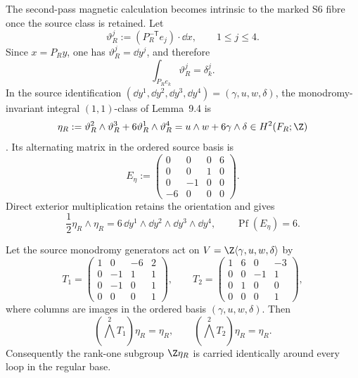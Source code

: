 The second-pass magnetic calculation becomes intrinsic to the marked S6
fibre once the source class is retained.  Let
\begin{equation}\label{eq:s6cusp-integral-coframe}
 \vartheta_R^j:=(P_R^{-\mathsf T}e_j)\mathbin{\cdot}\dd x,
 \qquad 1\le j\le4.
\end{equation}
Since \(x=P_Ry\), one has \(\vartheta_R^j=\dd y^j\), and therefore
\begin{equation}\label{eq:s6cusp-integral-periods}
 \int_{P_Re_k}\vartheta_R^j=\delta_k^j.
\end{equation}
In the source identification
\((\dd y^1,\dd y^2,\dd y^3,\dd y^4)=(\gamma,u,w,\delta)\),
the monodromy-invariant integral \((1,1)\)-class of Lemma~9.4 is
\begin{equation}\label{eq:s6cusp-native-eta}
 \eta_R:=
 \vartheta_R^2\wedge\vartheta_R^3
 +6\vartheta_R^1\wedge\vartheta_R^4
 =u\wedge w+6\gamma\wedge\delta
 \in H^2(F_R;\Z)
 \end{equation}
\cite{S6Internal}.  Its alternating matrix in the ordered source basis is
\begin{equation}\label{eq:s6cusp-native-eta-matrix}
 E_\eta:=
 \begin{pmatrix}
 0&0&0&6\\
 0&0&1&0\\
 0&-1&0&0\\
 -6&0&0&0
 \end{pmatrix}.
\end{equation}
Direct exterior multiplication retains the orientation and gives
\begin{equation}\label{eq:s6cusp-native-eta-square-pfaffian}
 \frac12\eta_R\wedge\eta_R
 =6\,\dd y^1\wedge\dd y^2\wedge\dd y^3\wedge\dd y^4,
 \qquad
 \operatorname{Pf}(E_\eta)=6.
\end{equation}

\begin{proposition}
\label{prop:s6cusp-native-eta-monodromy}
Let the source monodromy generators act on
\(V=\Z\langle\gamma,u,w,\delta\rangle\) by
\begin{equation}\label{eq:s6cusp-source-cohomology-monodromy}
 T_1=
 \begin{pmatrix}
 1&0&-6&2\\
 0&-1&1&1\\
 0&-1&0&1\\
 0&0&0&1
 \end{pmatrix},
 \qquad
 T_2=
 \begin{pmatrix}
 1&6&0&-3\\
 0&0&-1&1\\
 0&1&0&0\\
 0&0&0&1
 \end{pmatrix},
\end{equation}
where columns are images in the ordered basis
\((\gamma,u,w,\delta)\).  Then
\begin{equation}\label{eq:s6cusp-native-eta-generator-invariance}
 (\bigwedge^2T_1)\eta_R=\eta_R,
 \qquad
 (\bigwedge^2T_2)\eta_R=\eta_R.
\end{equation}
Consequently the rank-one subgroup \(\Z\eta_R\) is carried identically
around every loop in the regular base.
\end{proposition}

